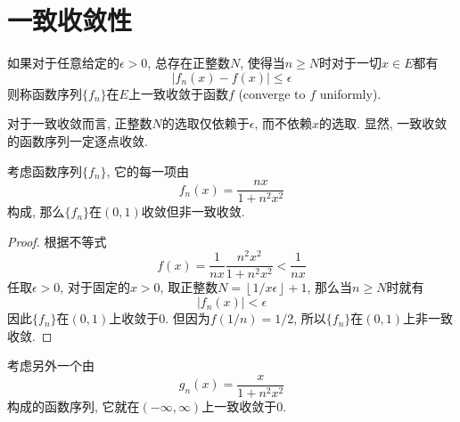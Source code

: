 \documentclass[cn,12pt,math=mtpro2,citestyle=gb7714-2015,bibstyle=gb7714-2015,twocol]{elegantbook}
\begin{document}
\section{一致收敛性}
\begin{definition}\label{def:def7.1}
如果对于任意给定的$\epsilon>0$, 总存在正整数$N$, 使得当$n\geq N$时对于一切$x\in E$都有
\begin{equation}\label{eq7.4}
  |f_n(x)-f(x)|\leq\epsilon
\end{equation}
则称函数序列$\{f_n\}$在$E$上一致收敛于函数$f$ (converge to $f$ uniformly).
\end{definition}
\begin{remark}
对于一致收敛而言, 正整数$N$的选取仅依赖于$\epsilon$, 而不依赖$x$的选取. 显然, 一致收敛的函数序列一定逐点收敛.
\end{remark}
\begin{example}
考虑函数序列$\{f_n\}$, 它的每一项由
$$f_n(x)=\frac{nx}{1+n^2x^2}$$
构成,  那么$\{f_n\}$在$(0,1)$收敛但非一致收敛.
\end{example}

\begin{proof}
  根据不等式
  $$f(x)=\frac{1}{nx}\frac{n^2x^2}{1+n^2x^2}<\frac{1}{nx}$$
  任取$\epsilon>0$, 对于固定的$x>0$, 取正整数$\displaystyle N=\left\lfloor1/x\epsilon\right\rfloor+1$, 那么当$n\geq N$时就有
  $$|f_n(x)|<\epsilon$$
  因此$\{f_n\}$在$(0,1)$上收敛于0. 但因为$f(1/n)=1/2$, 所以$\{f_n\}$在$(0,1)$上非一致收敛.
\end{proof}
\begin{example}
考虑另外一个由
$$g_n(x)=\frac{x}{1+n^2x^2}$$
构成的函数序列, 它就在$(-\infty,\infty)$上一致收敛于0.
\end{example}
\end{document}
